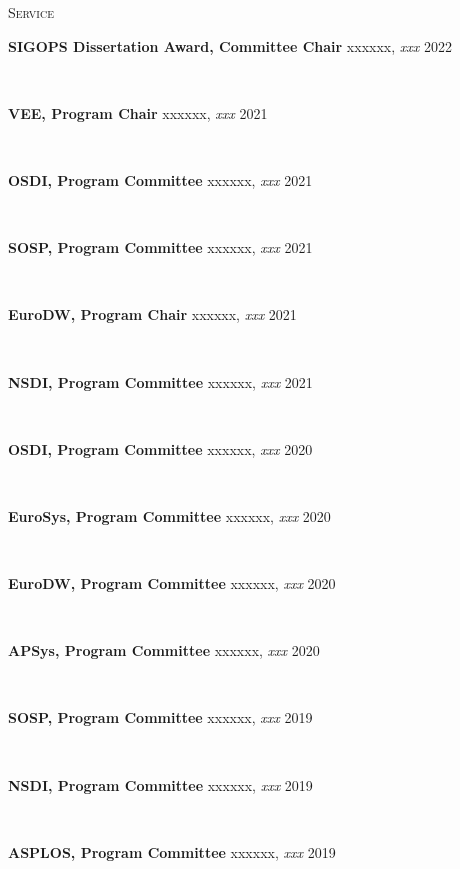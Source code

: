 \documentclass[10pt,times]{report}
\newlength{\sectiongap}
\newlength{\entrygap}
\newlength{\sectioncolwidth}
\newlength{\colgap}
\newlength{\stuffwidth}
\def\ifEqString#1#2{\def\testa{#1}\def\testb{#2}%
  \ifx\testa\testb}
\newenvironment{rtable}{
  \begin{minipage}{\textwidth}
  }{
  \end{minipage}
}
\newenvironment{rentry}[3][xxx]{
  \begin{minipage}[t]{\hsize}
    \textbf{#2}\ifEqString{#1}{xxx}\relax\else, \textit{#1}\fi
    \hspace{\stretch{1}} #3 \\
  }{
    \removelastskip
  \end{minipage}
  \\[\entrygap]  %
}
\newenvironment{rsection}[1]{
  \begin{minipage}[t]{\sectioncolwidth}
    \textsc{#1}
  \end{minipage}
  \hspace{\colgap}
  \begin{minipage}[t]{\stuffwidth}
  }{
    \removelastskip
  \end{minipage}
  \\[\sectiongap]
}
\begin{document}
\begin{rtable}
\begin{rsection}{Service}
\begin{rentry}{SIGOPS Dissertation Award, Committee Chair}{2022}
      \vspace{-0.7em}
    \end{rentry}
    \begin{rentry}{VEE, Program Chair}{2021}
      \vspace{-0.7em}
    \end{rentry}
    \begin{rentry}{OSDI, Program Committee}{2021}
      \vspace{-0.7em}
    \end{rentry}
    \begin{rentry}{SOSP, Program Committee}{2021}
      \vspace{-0.7em}
    \end{rentry}
    \begin{rentry}{EuroDW, Program Chair}{2021}
      \vspace{-0.7em}
    \end{rentry}
    \begin{rentry}{NSDI, Program Committee}{2021}
      \vspace{-0.7em}
    \end{rentry}
    \begin{rentry}{OSDI, Program Committee}{2020}
      \vspace{-0.7em}
    \end{rentry}
    \begin{rentry}{EuroSys, Program Committee}{2020}
       \vspace{-0.7em}
    \end{rentry}
    \begin{rentry}{EuroDW, Program Committee}{2020}
       \vspace{-0.7em}
    \end{rentry}
    \begin{rentry}{APSys, Program Committee}{2020}
       \vspace{-0.7em}
    \end{rentry}
    \begin{rentry}{SOSP, Program Committee}{2019}
       \vspace{-0.7em}
    \end{rentry}
    \begin{rentry}{NSDI, Program Committee}{2019}
       \vspace{-0.7em}
    \end{rentry}
    \begin{rentry}{ASPLOS, Program Committee}{2019}
       \vspace{-0.7em}
    \end{rentry}

\end{rsection}
\end{rtable}
\end{document}
